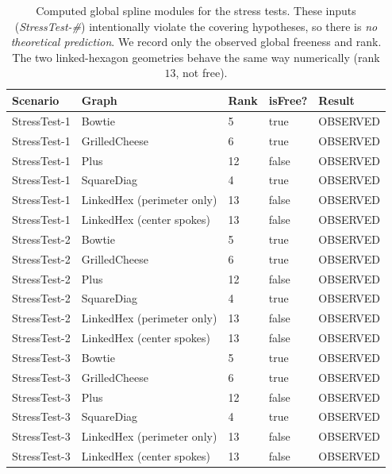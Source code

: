 \documentclass{article}
\begin{document}
\begin{table}[ht]
\centering
\label{tab:stress-results}
\begin{tabular}{lllll}
\toprule
Scenario & Graph & Rank & isFree? & Result \\
\midrule
StressTest-1 & Bowtie                      & 5  & true  & OBSERVED \\
StressTest-1 & GrilledCheese               & 6  & true  & OBSERVED \\
StressTest-1 & Plus                        & 12 & false & OBSERVED \\
StressTest-1 & SquareDiag                  & 4  & true  & OBSERVED \\
StressTest-1 & LinkedHex (perimeter only)  & 13 & false & OBSERVED \\
StressTest-1 & LinkedHex (center spokes)   & 13 & false & OBSERVED \\
\midrule
StressTest-2 & Bowtie                      & 5  & true  & OBSERVED \\
StressTest-2 & GrilledCheese               & 6  & true  & OBSERVED \\
StressTest-2 & Plus                        & 12 & false & OBSERVED \\
StressTest-2 & SquareDiag                  & 4  & true  & OBSERVED \\
StressTest-2 & LinkedHex (perimeter only)  & 13 & false & OBSERVED \\
StressTest-2 & LinkedHex (center spokes)   & 13 & false & OBSERVED \\
\midrule
StressTest-3 & Bowtie                      & 5  & true  & OBSERVED \\
StressTest-3 & GrilledCheese               & 6  & true  & OBSERVED \\
StressTest-3 & Plus                        & 12 & false & OBSERVED \\
StressTest-3 & SquareDiag                  & 4  & true  & OBSERVED \\
StressTest-3 & LinkedHex (perimeter only)  & 13 & false & OBSERVED \\
StressTest-3 & LinkedHex (center spokes)   & 13 & false & OBSERVED \\
\bottomrule
\end{tabular}
\caption{Computed global spline modules for the stress tests.
These inputs (\textit{StressTest-\#}) intentionally violate the covering hypotheses, so there is \emph{no theoretical prediction}. We record only the observed global freeness and rank. The two linked-hexagon geometries behave the same way numerically (rank \(13\), not free).}
\end{table}
\end{document}
